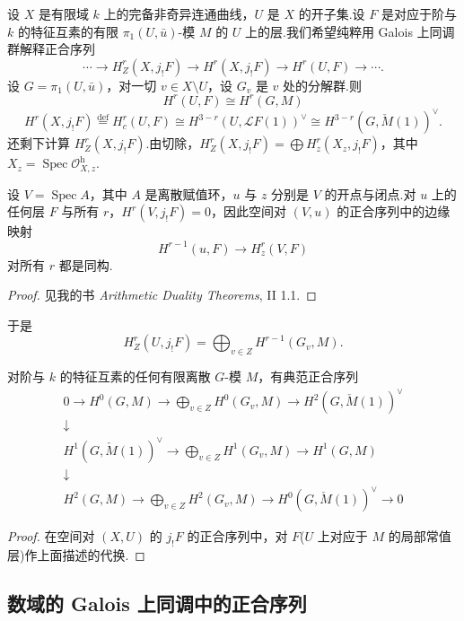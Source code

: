 设 $X$ 是有限域 $k$ 上的完备非奇异连通曲线，$U$ 是 $X$ 的开子集.设 $F$ 是对应于阶与 $k$ 的特征互素的有限 $\pi_1(U, \bar{u})$-模 $M$ 的 $U$ 上的层.我们希望纯粹用 Galois 上同调群解释正合序列
\[
\cdots \to H^{r}_{Z}(X, j_{!}F) \to H^{r}(X, j_{!}F) \to H^{r}(U, F) \to \cdots.
\]
设 $G = \pi_1(U, \bar{u})$，对一切 $v \in X \setminus U$，设 $G_v$ 是 $v$ 处的分解群.则
\[
H^{r}(U, F) \cong H^{r}(G, M)
\]
\[
H^{r}(X, j_{!}F) \overset{\mathrm{def}}{=} H^{r}_{c}(U, F) \cong H^{3-r}(U, \mathcal{L}F(1))^{\vee} \cong H^{3-r}(G, \check{M}(1))^{\vee}.
\]
还剩下计算 $H^{r}_{Z}(X, j_{!}F)$.由切除，$H^{r}_{Z}(X, j_{!}F) = \bigoplus H^{r}_{z}(X_z, j_{!}F)$，其中 $X_z = \operatorname{Spec} \mathcal{O}^{\mathrm{h}}_{X, z}$.

\begin{lemma}\label{lem:14.17}
设 $V = \operatorname{Spec} A$，其中 $A$ 是离散赋值环，$u$ 与 $z$ 分别是 $V$ 的开点与闭点.对 $u$ 上的任何层 $F$ 与所有 $r$，$H^{r}(V, j_{!}F) = 0$，因此空间对 $(V, u)$ 的正合序列中的边缘映射
\[
H^{r-1}(u, F) \to H^{r}_{z}(V, F)
\]
对所有 $r$ 都是同构.
\end{lemma}

\begin{proof}
见我的书 \emph{Arithmetic Duality Theorems}, II 1.1.
\end{proof}

于是
\[
H^{r}_{Z}(U, j_{!}F) = \bigoplus_{v \in Z} H^{r-1}(G_v, M).
\]

\begin{theorem}\label{thm:14.18}
对阶与 $k$ 的特征互素的任何有限离散 $G$-模 $M$，有典范正合序列
\[
\begin{array}{c}
0 \to H^{0}(G, M) \to \displaystyle\bigoplus_{v \in Z} H^{0}(G_v, M) \to H^{2}(G, \check{M}(1))^{\vee} \\
\downarrow \\
H^{1}(G, \check{M}(1))^{\vee} \to \displaystyle\bigoplus_{v \in Z} H^{1}(G_v, M) \to H^{1}(G, M) \\
\downarrow \\
H^{2}(G, M) \to \displaystyle\bigoplus_{v \in Z} H^{2}(G_v, M) \to H^{0}(G, \check{M}(1))^{\vee} \to 0
\end{array}
\]
\end{theorem}

\begin{proof}
在空间对 $(X, U)$ 的 $j_{!}F$ 的正合序列中，对 $F$($U$ 上对应于 $M$ 的局部常值层)作上面描述的代换.
\end{proof}

\subsection*{数域的 Galois 上同调中的正合序列}

